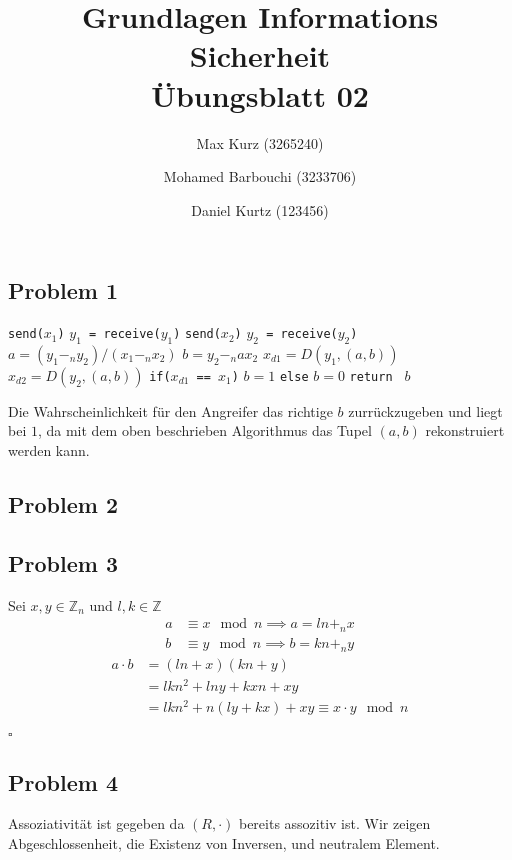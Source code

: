 \documentclass[12pt, german]{article}
\title{Grundlagen Informations Sicherheit \\ Übungsblatt 02}
\author{Max Kurz (3265240)  \and Mohamed Barbouchi (3233706) \and Daniel Kurtz (123456)}
\date{}
\newcommand{\bewiesen}{\begin{flushright}$\square$ \end{flushright} }
\begin{document}
	\maketitle
    \subsection*{Problem 1}
   	\begin{algorithm} 
    		\centering
    		\caption{$D(Y)$}
    		\label{Alg:1}
    		\begin{algorithmic}[1]
    			\State \texttt{send($x_1$)}  
    			\State \texttt{$y_1$ = receive($y_1$)}
    			\State \texttt{send($x_2$)}  
    			\State \texttt{$y_2$ = receive($y_2$)}
    			\State  $a= (y_1 -_n y_2)/(x_1 -_n x_2)$ 
    			\State $b=y_2 -_n ax_2$
    			\State $x_{d1}= D(y_1, (a,b))$
    			\State $x_{d2}= D(y_2, (a,b))$
    			\State  \texttt{if($x_{d1}$ == $x_1$)}{	$b = 1$ \texttt{else} $b = 0$ }
    			\State \texttt{return } $b$
    		\end{algorithmic}
    	\end{algorithm} 		
    Die Wahrscheinlichkeit für den Angreifer das richtige $b$ zurrückzugeben und liegt bei $1$, da mit dem oben beschrieben Algorithmus das Tupel $(a,b)$ rekonstruiert werden kann.
    
    \subsection*{Problem 2}
    
    \subsection*{Problem 3}
    	Sei  $x, y \in \mathbb{Z}_n$ und $l,k \in \mathbb{Z}$
    	\begin{align*}
    			a &\equiv x \mod n 	\implies	a = ln +_n x \\
    			b &\equiv y \mod n \implies 	b = kn +_n y
    	\end{align*}
    	\begin{align*}
    	a\cdot b &= (ln +x)(kn +y) \\
    	&=lkn^2 +lny +kxn + xy \\
    	&= lkn^2 +n(ly +kx) +xy \equiv x\cdot y \mod n
    	\end{align*}
    	\bewiesen
    
    
       \subsection*{Problem 4}
    	Assoziativität ist gegeben da $(R, \cdot)$ bereits assozitiv ist. Wir zeigen Abgeschlossenheit, die Existenz von Inversen, und neutralem Element. 
\end{document}
